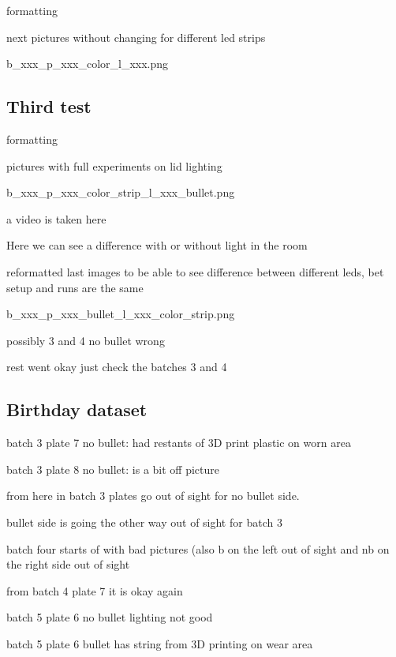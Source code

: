 \documentclass{article}
\begin{document}
formatting 

next pictures without changing for different led strips

b\_xxx\_p\_xxx\_color\_l\_xxx.png



\subsection{Third test}

formatting

pictures with full experiments on lid lighting

b\_xxx\_p\_xxx\_color\_strip\_l\_xxx\_bullet.png

a video is taken here 

Here we can see a difference with or without light in the room



reformatted last images to be able to see difference between different leds, bet setup and runs are the same

b\_xxx\_p\_xxx\_bullet\_l\_xxx\_color\_strip.png





possibly 3 and 4 no bullet wrong 

rest went okay just check the batches 3 and 4



\subsection{Birthday dataset}

batch 3 plate 7 no bullet:  had restants of 3D print plastic on worn area

batch 3 plate 8 no bullet:  is a bit off picture

from here in batch 3 plates go out of sight for no bullet side. 



bullet side is going the other way out of sight for batch 3 

batch four starts of with bad pictures (also b on the left out of sight and nb on the right side out of sight



from batch 4 plate 7 it is okay again



batch 5 plate 6 no bullet lighting not good

batch 5 plate 6 bullet has string from 3D printing on wear area
\end{document}
